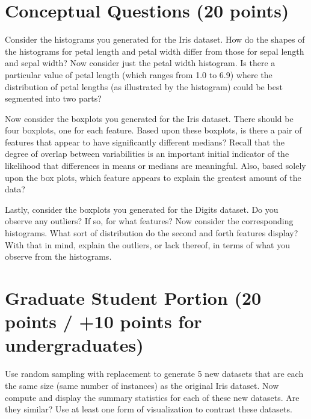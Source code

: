 \documentclass[paper=a4, fontsize=11pt]{scrartcl} %
\numberwithin{equation}{section} %
\numberwithin{figure}{section} %
\numberwithin{table}{section} %
\begin{document}
\section{Conceptual Questions (20 points)}

Consider the histograms you generated for the Iris dataset. How do the shapes of the histograms for petal length and petal width differ from those for sepal length and sepal width? Now consider just the petal width histogram. Is there a particular value of petal length (which ranges from 1.0 to 6.9) where the distribution of petal lengths (as illustrated by the histogram) could be best segmented into two parts?
\linebreak
\vspace{-3pt}

Now consider the boxplots you generated for the Iris dataset. There should be four boxplots, one for each feature. Based upon these boxplots, is there a pair of features that appear to have significantly different medians? Recall that the degree of overlap between variabilities is an important initial indicator of the likelihood that differences in means or medians are meaningful. Also, based solely upon the box plots, which feature appears to explain the greatest amount of the data?
\linebreak
\vspace{-3pt}

Lastly, consider the boxplots you generated for the Digits dataset. Do you observe any outliers? If so, for what features? Now consider the corresponding histograms. What sort of distribution do the second and forth features display? With that in mind, explain the outliers, or lack thereof, in terms of what you observe from the histograms.

\section{Graduate Student Portion (20 points / +10 points for undergraduates)}
Use random sampling with replacement to generate 5 new datasets that are each the same size (same number of instances) as the original Iris dataset. Now compute and display the summary statistics for each of these new datasets. Are they similar? Use at least one form of visualization to contrast these datasets.
\end{document}
